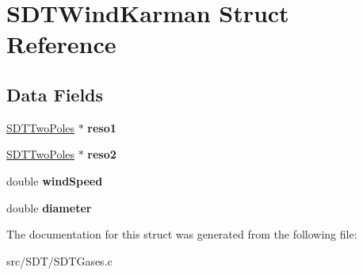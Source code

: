 \hypertarget{struct_s_d_t_wind_karman}{}\section{S\+D\+T\+Wind\+Karman Struct Reference}
\label{struct_s_d_t_wind_karman}
\subsection*{Data Fields}
\begin{DoxyCompactItemize}
\item 
\hypertarget{struct_s_d_t_wind_karman_a094609f6a6e339abd0a546926d0c5d87}{}\hyperlink{struct_s_d_t_two_poles}{S\+D\+T\+Two\+Poles} $\ast$ {\bfseries reso1}\label{struct_s_d_t_wind_karman_a094609f6a6e339abd0a546926d0c5d87}

\item 
\hypertarget{struct_s_d_t_wind_karman_a96c0f0a576271b9d306b5c452fdc7133}{}\hyperlink{struct_s_d_t_two_poles}{S\+D\+T\+Two\+Poles} $\ast$ {\bfseries reso2}\label{struct_s_d_t_wind_karman_a96c0f0a576271b9d306b5c452fdc7133}

\item 
\hypertarget{struct_s_d_t_wind_karman_a1e61109612ce4b40408c03d7d23405c5}{}double {\bfseries wind\+Speed}\label{struct_s_d_t_wind_karman_a1e61109612ce4b40408c03d7d23405c5}

\item 
\hypertarget{struct_s_d_t_wind_karman_a2242a375bebbd1a1d1cf02a80d2715a2}{}double {\bfseries diameter}\label{struct_s_d_t_wind_karman_a2242a375bebbd1a1d1cf02a80d2715a2}

\end{DoxyCompactItemize}


The documentation for this struct was generated from the following file\+:\begin{DoxyCompactItemize}
\item 
src/\+S\+D\+T/S\+D\+T\+Gases.\+c\end{DoxyCompactItemize}
